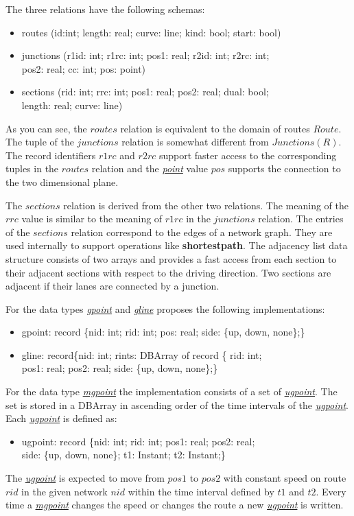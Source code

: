 \documentclass[a4paper]{article}
\newcommand{\op}[1]{\textbf{#1}}
\newcommand{\dt}[1]{\textsl{\underline{#1}}}
\begin{document}
The three relations have the following schemas:
\begin{ttfamily}
\begin{itemize}
  \item [] routes (id:int; length: real; curve: line; kind: bool; start: bool)
  \item [] junctions (r1id: int; r1rc: int; pos1: real; r2id: int; r2rc: int;\\
pos2: real; cc: int; pos: point)
  \item [] sections (rid: int; rrc: int; pos1: real; pos2: real; dual: bool;\\
length: real; curve: line)
\end{itemize}
\end{ttfamily}
As you can see, the $routes$ relation is equivalent to the domain of routes $Route$.
The tuple of the $junctions$ relation is somewhat different from $Junctions(R)$.
The record identifiers $r1rc$ and $r2rc$ support faster access to the corresponding
tuples in the $routes$ relation and the \dt{point} value $pos$ supports the 
connection
to the two dimensional plane.

The $sections$ relation is derived from the other two relations. The meaning of
the $rrc$ value is similar to the meaning of $r1rc$ in the $junctions$ relation.
The entries of the $sections$ relation correspond to the edges of a network graph.
They are used internally to support operations like \op{shortestpath}. The adjacency
list data structure consists of two arrays and provides a fast
access from each section to their adjacent sections with respect to the driving
direction. Two sections are adjacent if their lanes are connected by a junction.

For the data types \dt{gpoint} and \dt{gline} \cite{NetworkGueting} proposes
the following implementations:
\begin{ttfamily}
\begin{itemize}
  \item [] gpoint: record \{nid: int; rid: int; pos: real; side: \{up,
down, none\};\}
  \item [] gline: record\{nid: int; rints: DBArray of record \{ rid: int;\\
pos1: real; pos2: real; side: \{up, down, none\};\}
\end{itemize}
\end{ttfamily}
For the data type \dt{mgpoint} the implementation consists of a set of \dt{ugpoint}.
The set is stored in a DBArray in ascending order of the time intervals of the
\dt{ugpoint}. Each \dt{ugpoint} is defined as:
\begin{ttfamily}
\begin{itemize}
  \item [] ugpoint: record \{nid: int; rid: int; pos1: real; pos2: real;\\
side: \{up, down, none\}; t1: Instant; t2: Instant;\}
\end{itemize}
\end{ttfamily}
The \dt{ugpoint} is expected to move from $pos1$ to $pos2$ with constant speed on
route $rid$ in the given network $nid$ within the time interval defined by $t1$
and $t2$. Every time a \dt{mgpoint} changes the speed or changes the route a new
\dt{ugpoint} is written.
\end{document}
